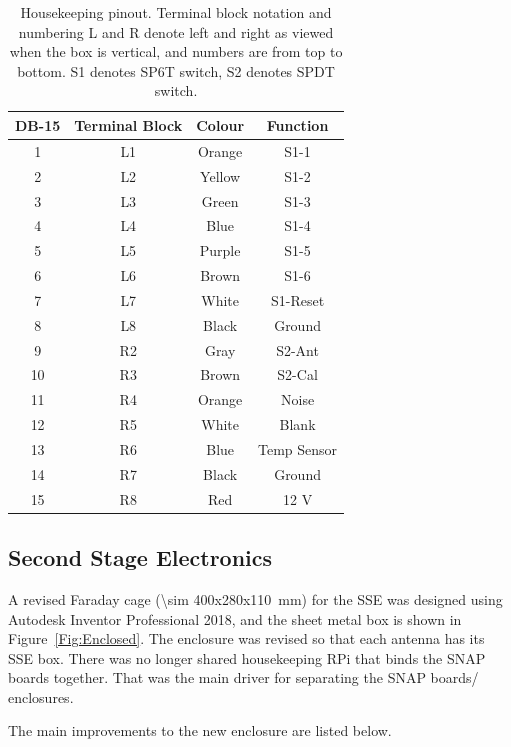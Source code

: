 \begin{table}
	\centering
	\begin{tabular}{ c|c|c|c} 
		\hline
		DB-15 & Terminal Block & Colour & Function \\
		\hline
		\hline
		1 & L1 & Orange & S1-1 \\ 
		2 & L2 & Yellow & S1-2 \\ 
		3 & L3 & Green & S1-3 \\
		4 & L4 & Blue & S1-4 \\
		5 & L5 & Purple & S1-5 \\
		6 & L6 & Brown & S1-6 \\
		7 & L7 & White & S1-Reset \\
		8 & L8 & Black & Ground \\
		9 & R2 & Gray & S2-Ant \\
		10 & R3 & Brown & S2-Cal \\
		11 & R4 & Orange & Noise \\
		12 & R5 & White & Blank \\
		13 & R6 & Blue & Temp Sensor \\
		14 & R7 & Black & Ground \\
		15 & R8 & Red & 12 V \\
		\hline
	\end{tabular}
	\caption{Housekeeping pinout. Terminal block notation and numbering L and R denote left and right as viewed when the box is vertical, and numbers are from top to bottom. S1 denotes SP6T switch, S2 denotes SPDT switch.}
	\label{Tab:Pinout}
\end{table}


\subsection{Second Stage Electronics}

A revised Faraday cage (\SI{\sim 400x280x110}{\milli \meter}) for the SSE was designed using Autodesk Inventor Professional 2018, and the sheet metal box is shown in Figure~\ref{Fig:Enclosed}. The enclosure was revised so that each antenna has its SSE box.  There was no longer shared housekeeping RPi that binds the SNAP boards together. That was the main driver for separating the SNAP boards/ enclosures.  

The main improvements to the new enclosure are listed below.

